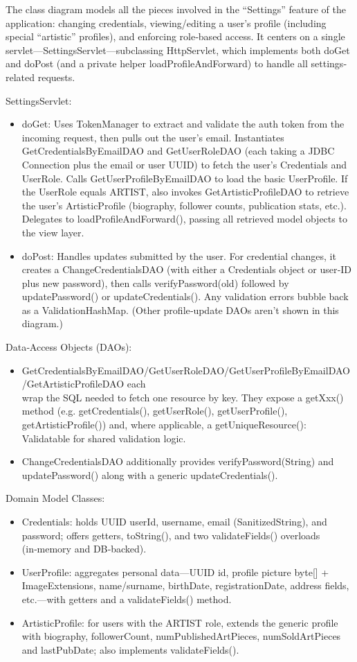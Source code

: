 The class diagram models all the pieces involved in the “Settings” feature of the application: changing credentials, viewing/editing a user’s profile (including special “artistic” profiles), and enforcing role‐based access. It centers on a single servlet—SettingsServlet—subclassing HttpServlet, which implements both doGet and doPost (and a private helper loadProfileAndForward) to handle all settings‐related requests.

SettingsServlet:
\begin{itemize}
    \item doGet: Uses TokenManager to extract and validate the auth token from the incoming request, then pulls out the user’s email.
    Instantiates GetCredentialsByEmailDAO and GetUserRoleDAO (each taking a JDBC Connection plus the email or user UUID) to fetch the user’s Credentials and UserRole.
    Calls GetUserProfileByEmailDAO to load the basic UserProfile.
    If the UserRole equals ARTIST, also invokes GetArtisticProfileDAO to retrieve the user’s ArtisticProfile (biography, follower counts, publication stats, etc.).
    Delegates to loadProfileAndForward(), passing all retrieved model objects to the view layer.
    \item doPost: Handles updates submitted by the user. For credential changes, it creates a ChangeCredentialsDAO (with either a Credentials object or user‐ID plus new password), then calls verifyPassword(old) followed by updatePassword() or updateCredentials(). Any validation errors bubble back as a ValidationHashMap. (Other profile‐update DAOs aren’t shown in this diagram.)
\end{itemize}

Data‐Access Objects (DAOs):
\begin{itemize}
    \item GetCredentialsByEmailDAO/GetUserRoleDAO/GetUserProfileByEmailDAO/GetArtisticProfileDAO each\\ wrap the SQL needed to fetch one resource by key. They expose a getXxx() method (e.g. getCredentials(), getUserRole(), getUserProfile(), getArtisticProfile()) and, where applicable, a getUniqueResource(): Validatable for shared validation logic.
    \item ChangeCredentialsDAO additionally provides verifyPassword(String) and updatePassword() along with a generic updateCredentials().
\end{itemize}

Domain Model Classes:
\begin{itemize}
    \item Credentials: holds UUID userId, username, email (SanitizedString), and password; offers getters, toString(), and two validateFields() overloads (in‑memory and DB‐backed).
    \item UserProfile: aggregates personal data—UUID id, profile picture byte[] + ImageExtensions, name/surname, birthDate, registrationDate, address fields, etc.—with getters and a validateFields() method.
    \item ArtisticProfile: for users with the ARTIST role, extends the generic profile with biography, followerCount, numPublishedArtPieces, numSoldArtPieces and lastPubDate; also implements validateFields().
\end{itemize}

